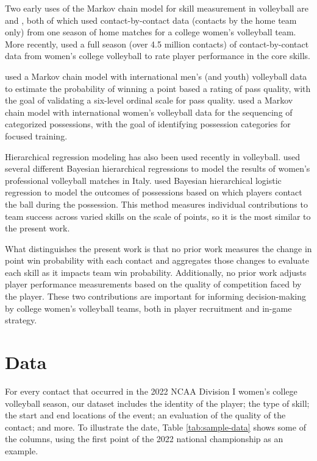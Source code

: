 \documentclass[USenglish]{article}
\theoremstyle{dgthm}
\theoremstyle{dgdef}
\begin{document}
Two early uses of the Markov chain model for skill measurement in volleyball are \textcite{florence_etal_2008} and \textcite{miskin_etal_2010}, both of which used contact-by-contact data (contacts by the home team only) from one season of home matches for a college women's volleyball team. More recently, \textcite{bagley_ware_2017} used a full season (over 4.5 million contacts) of contact-by-contact data from women's college volleyball to rate player performance in the core skills.

\textcite{drikos_2018} used a Markov chain model with international men's (and youth) volleyball data to estimate the probability of winning a point based a rating of pass quality, with the goal of validating a six-level ordinal scale for pass quality. \textcite{hileno_etal_2020} used a Markov chain model with international women's volleyball data for the sequencing of categorized possessions, with the goal of identifying possession categories for focused training.

Hierarchical regression modeling has also been used recently in volleyball. \textcite{gabrio_2021} used several different Bayesian hierarchical regressions to model the results of women's professional volleyball matches in Italy. \textcite{fellingham_2022} used Bayesian hierarchical logistic regression to model the outcomes of possessions based on which players contact the ball during the possession. This method measures individual contributions to team success across varied skills on the scale of points, so it is the most similar to the present work.

What distinguishes the present work is that no prior work measures the change in point win probability with each contact and aggregates those changes to evaluate each skill as it impacts team win probability. Additionally, no prior work adjusts player performance measurements based on the quality of competition faced by the player. These two contributions are important for informing decision-making by college women's volleyball teams, both in player recruitment and in-game strategy.


\section{Data}
\label{sec:data}

For every contact that occurred in the 2022 NCAA Division I women's college volleyball season, our dataset includes the identity of the player; the type of skill; the start and end locations of the event; an evaluation of the quality of the contact; and more. To illustrate the date, Table \ref{tab:sample-data} shows some of the columns, using the first point of the 2022 national championship as an example.
\end{document}
